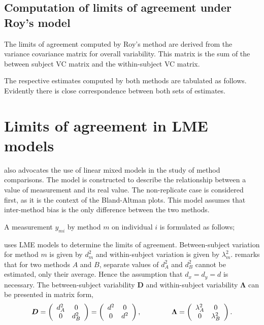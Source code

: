 \documentclass[12pt, a4paper]{report}
\theoremstyle{plain}
\theoremstyle{definition}
\theoremstyle{remark}
\begin{document}
\subsection{Computation of limits of agreement under Roy's model}
The limits of agreement computed by Roy's method are derived from the variance covariance matrix for overall variability.
This matrix is the sum of the between subject VC matrix and the within-subject VC matrix.



The respective estimates computed by both methods are tabulated as follows. Evidently there is close correspondence between both sets of estimates.




\section{Limits of agreement in LME models}

\citet{BXC2004} also advocates the use of linear mixed models in the study of method comparisons. The model is constructed to describe the relationship between a value of measurement and its real value. The non-replicate case is considered first, as it is the context of the Bland-Altman plots. This model assumes that inter-method bias is the only difference between the two methods. 

A measurement $y_{mi}$ by method $m$ on individual $i$ is formulated as follows;

\citet{BXC2008} uses LME models to determine the limits of agreement. Between-subject variation for method $m$ is given by $d^2_{m}$ and within-subject variation is given by $\lambda^2_{m}$.  \citet{BXC2008} remarks that for two methods $A$ and $B$, separate values of $d^2_{A}$ and $d^2_{B}$ cannot be estimated, only their average. Hence the assumption that $d_{x}= d_{y}= d$ is necessary. The between-subject variability $\boldsymbol{D}$ and within-subject variability $\boldsymbol{\Lambda}$ can be presented in matrix form,\[
\boldsymbol{D} = \left(%
\begin{array}{cc}
d^2_{A}& 0 \\
0 & d^2_{B} \\
\end{array}%
\right)=\left(%
\begin{array}{cc}
d^2& 0 \\
0 & d^2\\
\end{array}%
\right),
\hspace{1.5cm}
\boldsymbol{\Lambda} = \left(%
\begin{array}{cc}
\lambda^2_{A}& 0 \\
0 & \lambda^2_{B} \\
\end{array}%
\right).
\]
\end{document}
